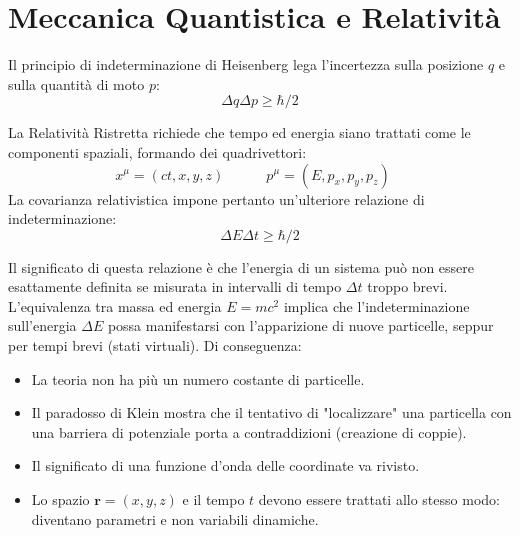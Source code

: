 \section{Meccanica Quantistica e Relatività}
Il principio di indeterminazione di Heisenberg lega l'incertezza sulla posizione $q$ e sulla quantità di moto $p$:
\begin{equation}
\Delta q\Delta p\ge\hbar/2
\end{equation}

La Relatività Ristretta richiede che tempo ed energia siano trattati come le componenti spaziali, formando dei quadrivettori:
\begin{equation*}
x^{\mu}=(ct,x,y,z) \quad \text{} \qquad p^{\mu}=(E,p_{x},p_{y},p_{z}) \quad \text{}
\end{equation*}
La covarianza relativistica impone pertanto un'ulteriore relazione di indeterminazione:
\begin{equation}
\Delta E\Delta t\ge\hbar/2
\end{equation}

Il significato di questa relazione è che l'energia di un sistema può non essere esattamente definita se misurata in intervalli di tempo $\Delta t$ troppo brevi.
L'equivalenza tra massa ed energia $E=mc^2$ implica che l'indeterminazione sull'energia $\Delta E$ possa manifestarsi con l'apparizione di nuove particelle, seppur per tempi brevi (stati virtuali).
Di conseguenza:
\begin{itemize}
    \item La teoria non ha più un numero costante di particelle.
    \item Il paradosso di Klein mostra che il tentativo di "localizzare" una particella con una barriera di potenziale porta a contraddizioni (creazione di coppie).
    \item Il significato di una funzione d'onda delle coordinate va rivisto.
    \item Lo spazio $\mathbf{r}=(x,y,z)$ e il tempo $t$ devono essere trattati allo stesso modo: diventano parametri e non variabili dinamiche.
\end{itemize}
